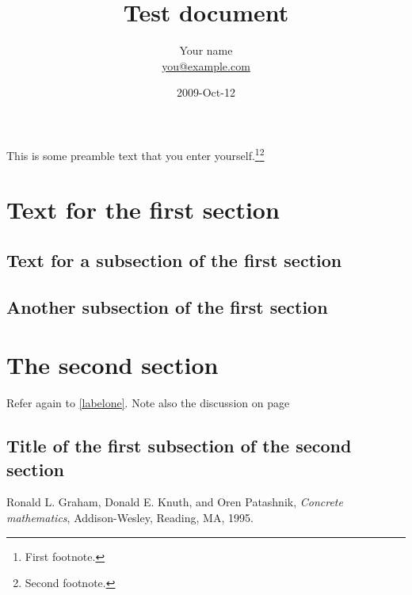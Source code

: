 \documentclass{article}
\title{Test document}
\author{Your name \\ \url{you@example.com}}
\date{2009-Oct-12}
\begin{document}
\maketitle
\tableofcontents
\newpage

This is some preamble text that you enter 
yourself.\footnote{First footnote.}\footnote{Second footnote.}

\section{Text for the first section}
\lipsum[1]

\subsection{Text for a subsection of the first section}
\lipsum[2-3]
\label{labelone}

\subsection{Another subsection of the first section}
\lipsum[4-5]
\label{labeltwo}

\section{The second section}
\lipsum[6]

Refer again to \ref{labelone}.\cite{ConcreteMath}
Note also the discussion on page \pageref{labeltwo}

\subsection{Title of the first subsection of the second section}
\lipsum[7]

\begin{thebibliography}{9}
Ronald L. Graham, Donald E. Knuth, and Oren Patashnik, 
\textit{Concrete mathematics}, 
Addison-Wesley, Reading, MA, 1995.
\end{thebibliography}
\end{document}
